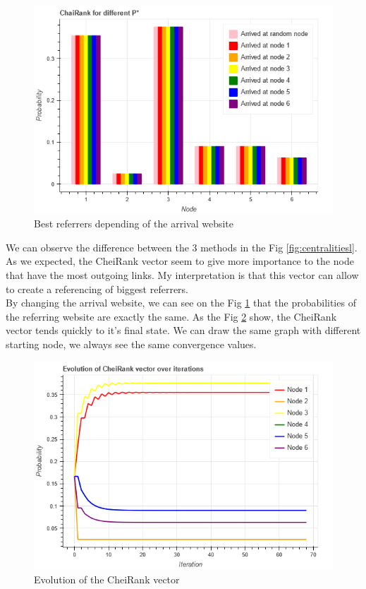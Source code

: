 \documentclass[12pt]{article}
\begin{document}
\begin{figure}[ht]
    \centering
    \includegraphics[width=\textwidth]{images/cheirank.png}
    \caption{Best referrers depending of the arrival website}
    \label{fig:cheirank}
\end{figure}

We can observe the difference between the 3 methods in the Fig \ref{fig:centralitiesl}. As we expected, the CheiRank vector seem to give more importance to the node that have the most outgoing links. My interpretation is that this vector can allow to create a referencing of biggest referrers.\\

By changing the arrival website, we can see on the Fig \ref{fig:cheirank} that the probabilities of the referring website are exactly the same. As the Fig \ref{fig:evolution} show, the CheiRank vector tends quickly to it's final state. We can draw the same graph with different starting node, we always see the same convergence values.

\begin{figure}[ht]
    \centering
    \includegraphics[width=\textwidth]{images/evolution.png}
    \caption{Evolution of the CheiRank vector}
    \label{fig:evolution}
\end{figure}
\end{document}
